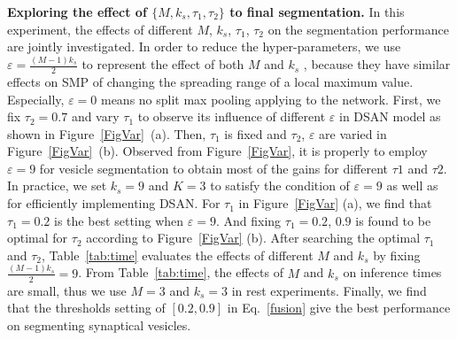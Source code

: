 \noindent\textbf{Exploring the effect of $\{M, k_s, \tau_1, \tau_2\}$ to final segmentation.}
In this experiment, the effects of different $M$, $k_s$, $\tau_1$, $\tau_2$ on the segmentation performance are jointly investigated.
In order to reduce the hyper-parameters, we use $\varepsilon=\frac{(M-1)k_s}{2}$ to represent the effect of both $M$ and $k_s$ , because they have similar effects on SMP of changing the spreading range of a local maximum value.
Especially, $\varepsilon=0$ means no split max pooling applying to the network.
First, we fix $\tau_2=0.7$ and vary $\tau_1$ to observe its influence of different $\varepsilon$ in DSAN model as shown in Figure~\ref{FigVar}~(a).
Then, $\tau_1$ is fixed and $\tau_2$, $\varepsilon$ are varied in Figure~\ref{FigVar}~(b).
Observed from Figure~\ref{FigVar}, it is properly to employ $\varepsilon=9$ for vesicle segmentation to obtain most of the gains for different $\tau1$ and $\tau2$.
In practice, we set $k_s=9$ and $K=3$ to satisfy the condition of $\varepsilon=9$ as well as for efficiently implementing DSAN.
For $\tau_1$ in Figure~\ref{FigVar} (a), we find that $\tau_1=0.2$ is the best setting when $\varepsilon=9$.
And fixing $\tau_1=0.2$, $0.9$ is found to be optimal for $\tau_2$ according to Figure~\ref{FigVar} (b).
After searching the optimal $\tau_1$ and $\tau_2$, Table~\ref{tab:time} evaluates the effects of different $M$ and $k_s$ by fixing $\frac{(M-1)k_s}{2}=9$.
From Table~\ref{tab:time}, the effects of $M$ and $k_s$ on inference times are small, thus we use $M=3$ and $k_s=3$ in rest experiments. 
Finally, we find that the thresholds setting of $[0.2, 0.9]$ in Eq.~\ref{fusion} give the best performance on segmenting synaptical vesicles.

